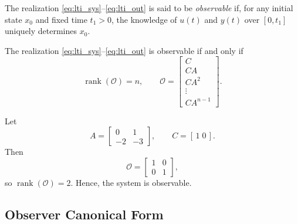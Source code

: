 \begin{definition}[Observability]
The realization \eqref{eq:lti_sys}--\eqref{eq:lti_out} is said to be \emph{observable} 
if, for any initial state $x_0$ and fixed time $t_1>0$, the knowledge of $u(t)$ and $y(t)$ 
over $[0,t_1]$ uniquely determines $x_0$.
\end{definition}

\begin{theorem}
The realization \eqref{eq:lti_sys}--\eqref{eq:lti_out} is observable if and only if
\begin{equation}
    \operatorname{rank}(\mathcal{O}) = n,
    \qquad 
    \mathcal{O} = 
    \begin{bmatrix}
        C \\ CA \\ CA^2 \\ \vdots \\ CA^{n-1}
    \end{bmatrix}.
\end{equation}
\end{theorem}

\begin{example}
Let 
\[
A = 
\begin{bmatrix}
0 & 1 \\ -2 & -3
\end{bmatrix}, \qquad
C = [\,1 \; 0\,].
\]
Then
\[
\mathcal{O} = 
\begin{bmatrix}
1 & 0\\
0 & 1
\end{bmatrix},
\]
so $\operatorname{rank}(\mathcal{O})=2$. Hence, the system is observable.
\end{example}

\subsection{Observer Canonical Form}


